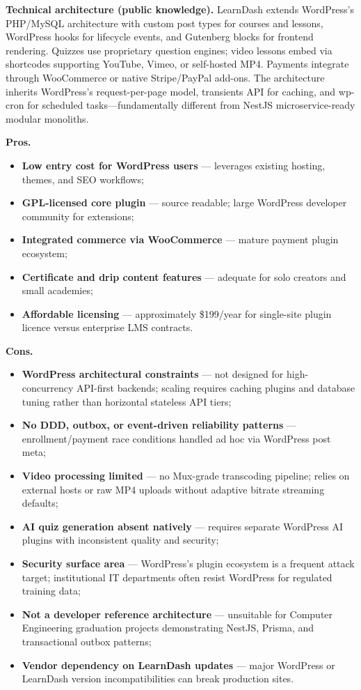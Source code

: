 \textbf{Technical architecture (public knowledge).}
LearnDash extends WordPress's PHP/MySQL architecture with custom post types for courses and lessons, WordPress hooks for lifecycle events, and Gutenberg blocks for frontend rendering. Quizzes use proprietary question engines; video lessons embed via shortcodes supporting YouTube, Vimeo, or self-hosted MP4. Payments integrate through WooCommerce or native Stripe/PayPal add-ons. The architecture inherits WordPress's request-per-page model, transients API for caching, and wp-cron for scheduled tasks---fundamentally different from NestJS microservice-ready modular monoliths.

\textbf{Pros.}
\begin{itemize}
  \item \textbf{Low entry cost for WordPress users} --- leverages existing hosting, themes, and SEO workflows;
  \item \textbf{GPL-licensed core plugin} --- source readable; large WordPress developer community for extensions;
  \item \textbf{Integrated commerce via WooCommerce} --- mature payment plugin ecosystem;
  \item \textbf{Certificate and drip content features} --- adequate for solo creators and small academies;
  \item \textbf{Affordable licensing} --- approximately \$199/year for single-site plugin licence versus enterprise LMS contracts.
\end{itemize}

\textbf{Cons.}
\begin{itemize}
  \item \textbf{WordPress architectural constraints} --- not designed for high-concurrency API-first backends; scaling requires caching plugins and database tuning rather than horizontal stateless API tiers;
  \item \textbf{No DDD, outbox, or event-driven reliability patterns} --- enrollment/payment race conditions handled ad hoc via WordPress post meta;
  \item \textbf{Video processing limited} --- no Mux-grade transcoding pipeline; relies on external hosts or raw MP4 uploads without adaptive bitrate streaming defaults;
  \item \textbf{AI quiz generation absent natively} --- requires separate WordPress AI plugins with inconsistent quality and security;
  \item \textbf{Security surface area} --- WordPress's plugin ecosystem is a frequent attack target; institutional IT departments often resist WordPress for regulated training data;
  \item \textbf{Not a developer reference architecture} --- unsuitable for Computer Engineering graduation projects demonstrating NestJS, Prisma, and transactional outbox patterns;
  \item \textbf{Vendor dependency on LearnDash updates} --- major WordPress or LearnDash version incompatibilities can break production sites.
\end{itemize}

